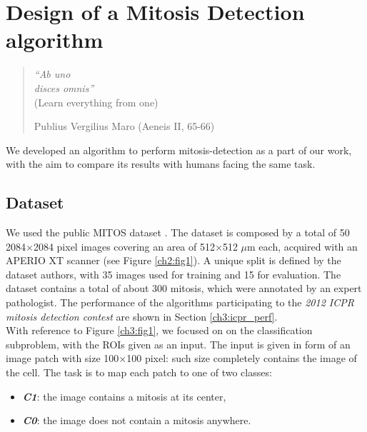 \chapter{Design of a Mitosis Detection algorithm}
\label{chapter4}
\thispagestyle{empty}

\begin{quotation}
{\footnotesize
\noindent \emph{``Ab uno\\ disces omnis''}\\
\noindent (Learn everything from one)
\begin{flushright}
Publius Vergilius Maro (Aeneis II, 65-66)
\end{flushright}
}
\end{quotation}

\vspace{0.5cm}


We developed an algorithm to perform mitosis-detection as a part of our work, with the aim to compare its results with humans facing the same task.

\section{Dataset}

We used the public MITOS dataset \cite{icpr}. The dataset is composed by a total of 50 2084$\times$2084 pixel images
covering an area of 512$\times$512 $\mu$m each, acquired with an APERIO XT scanner (see Figure \ref{ch2:fig1}). 
A unique split is defined by the dataset authors, with 35 images used for training and 15 for evaluation.
The dataset contains a total of about 300 mitosis, which were annotated by an expert pathologist.
The performance of the algorithms participating to the \textit{2012 ICPR mitosis detection contest} are shown in Section \ref{ch3:icpr_perf}.\\
With reference to Figure \ref{ch3:fig1}, we focused on on the classification subproblem, with the \Glspl{ROI} given as an input.
The input is given in form of an image patch with size 100$\times$100 pixel: such size completely contains the image of the cell.
The task is to map each patch to one of two classes:
\begin{itemize}
 \item [] \textit{\textbf{C1}}: the image contains a mitosis at its center,
 \item [] \textit{\textbf{C0}}: the image does not contain a mitosis anywhere. 
\end{itemize}

